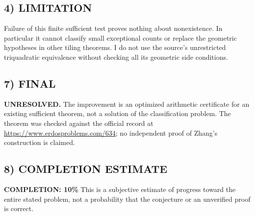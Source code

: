 \subsection*{4) LIMITATION}
Failure of this finite sufficient test proves nothing about nonexistence. In particular it cannot classify small exceptional counts or replace the geometric hypotheses in other tiling theorems. I do not use the source's unrestricted triquadratic equivalence without checking all its geometric side conditions.
\subsection*{7) FINAL}
\textbf{UNRESOLVED.} The improvement is an optimized arithmetic certificate for an existing sufficient theorem, not a solution of the classification problem.
\noindent The theorem was checked against the official record at \url{https://www.erdosproblems.com/634}; no independent proof of Zhang's construction is claimed.

\subsection*{8) COMPLETION ESTIMATE}
\textbf{COMPLETION: 10\%}
This is a subjective estimate of progress toward the entire stated problem, not a probability that the conjecture or an unverified proof is correct.

